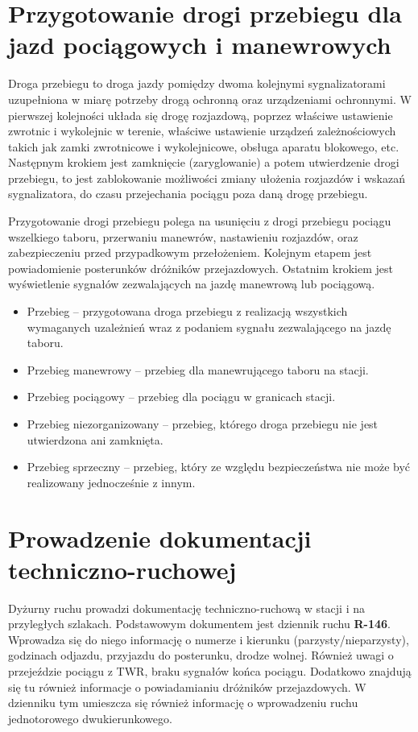 \chapter{Przygotowanie drogi przebiegu dla jazd pociągowych i manewrowych}


Droga przebiegu to droga jazdy pomiędzy dwoma kolejnymi sygnalizatorami uzupełniona w miarę potrzeby drogą ochronną oraz urządzeniami ochronnymi. W pierwszej kolejności układa się drogę rozjazdową, poprzez właściwe ustawienie zwrotnic i wykolejnic w terenie, właściwe ustawienie urządzeń zależnościowych takich jak zamki zwrotnicowe i wykolejnicowe, obsługa aparatu blokowego, etc. Następnym krokiem jest zamknięcie (zaryglowanie) a potem utwierdzenie drogi przebiegu, to jest zablokowanie możliwości zmiany ułożenia rozjazdów i wskazań sygnalizatora, do czasu przejechania pociągu poza daną drogę przebiegu.

Przygotowanie drogi przebiegu polega na usunięciu z drogi przebiegu pociągu wszelkiego taboru, przerwaniu manewrów, nastawieniu rozjazdów, oraz zabezpieczeniu przed przypadkowym przełożeniem. Kolejnym etapem jest powiadomienie posterunków dróżników przejazdowych. Ostatnim krokiem jest wyświetlenie sygnałów zezwalających na jazdę manewrową lub pociągową.

\begin{itemize}
	\item Przebieg – przygotowana droga przebiegu z realizacją wszystkich wymaganych uzależnień wraz z podaniem sygnału zezwalającego na jazdę taboru.
	\item Przebieg manewrowy – przebieg dla manewrującego taboru na stacji.
	\item Przebieg pociągowy – przebieg dla pociągu w granicach stacji.
	\item Przebieg niezorganizowany – przebieg, którego droga przebiegu nie jest utwierdzona ani zamknięta.
	\item Przebieg sprzeczny – przebieg, który ze względu bezpieczeństwa nie może być realizowany jednocześnie z innym. 
\end{itemize}

\chapter{Prowadzenie dokumentacji techniczno-ruchowej}

Dyżurny ruchu prowadzi dokumentację techniczno-ruchową w stacji i na przyległych szlakach. 
Podstawowym dokumentem jest dziennik ruchu \textbf{R-146}. Wprowadza się do niego informację o numerze i kierunku (parzysty/nieparzysty), godzinach odjazdu, przyjazdu do posterunku, drodze wolnej. Również uwagi o przejeździe pociągu z TWR, braku sygnałów końca pociągu. Dodatkowo znajdują się tu również informacje o powiadamianiu dróżników przejazdowych. W dzienniku tym umieszcza się również informację o wprowadzeniu ruchu jednotorowego dwukierunkowego.

